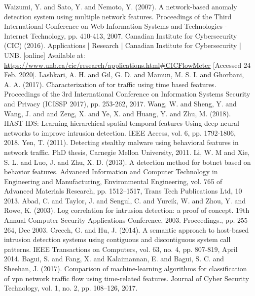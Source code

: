 \documentclass[conference]{IEEEtran}
\begin{document}
\begin{thebibliography}{00}
 Waizumi, Y. and Sato, Y. and Nemoto, Y. (2007). A network-based anomaly detection system using multiple network features. Proceedings of the Third International Conference on Web Information Systems and Technologies - Internet Technology, pp. 410-413, 2007.
 Canadian Institute for Cybersecurity (CIC) (2016). Applications | Research | Canadian Institute for Cybersecurity | UNB. [online] Available at: \url{https://www.unb.ca/cic/research/applications.html#CICFlowMeter} [Accessed 24 Feb. 2020].
 Lashkari, A. H. and Gil, G. D. and Mamun, M. S. I. and Ghorbani, A. A. (2017). Characterization of tor traffic using time based features. Proceedings of the 3rd International Conference on Information Systems Security and Privacy (ICISSP 2017), pp. 253-262, 2017.
 Wang, W. and Sheng, Y. and Wang, J. and and Zeng, X. and Ye, X. and Huang, Y. and Zhu, M. (2018). HAST-IDS: Learning hierarchical spatial-temporal features Using deep neural networks to improve intrusion detection. IEEE Access, vol. 6, pp. 1792-1806, 2018.
 Yen, T. (2011). Detecting stealthy malware using behavioral features in network traffic. PhD thesis, Carnegie Mellon University, 2011.
 Li, W. M and Xie, S. L. and Luo, J. and Zhu, X. D. (2013). A detection method for botnet based on behavior features. Advanced Information and Computer Technology in Engineering and Manufacturing, Environmental Engineering, vol. 765 of Advanced Materials Research, pp. 1512–1517, Trans Tech Publications Ltd, 10 2013.
 Abad, C. and Taylor, J. and Sengul, C.  and Yurcik, W. and Zhou, Y. and Rowe, K. (2003). Log correlation for intrusion detection: a proof of concept. 19th Annual Computer Security Applications Conference, 2003. Proceedings., pp. 255–264, Dec 2003.
 Creech, G. and Hu, J. (2014). A semantic approach to host-based intrusion detection systems using contiguous and discontiguous system call patterns. IEEE Transactions on Computers, vol. 63, no. 4, pp. 807-819, April 2014.
 Bagui, S. and Fang, X. and Kalaimannan, E. and Bagui, S. C. and Sheehan, J. (2017). Comparison of machine-learning algorithms for classification of vpn network traffic flow using time-related features. Journal of Cyber Security Technology, vol. 1, no. 2, pp. 108–126, 2017.
\end{thebibliography}


\vspace{12pt}
\color{red}
\end{document}
